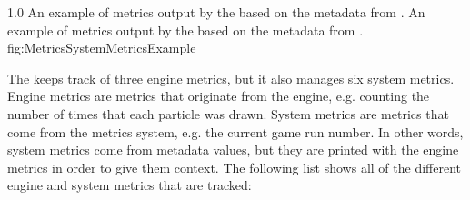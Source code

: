 {1.0}
{An example of metrics output by the  based on the metadata from .}
{An example of metrics output by the  based on the metadata from . }
{fig:MetricsSystemMetricsExample}


The  keeps track of three engine metrics, but it also manages six system metrics. Engine metrics are metrics that originate from the engine, e.g. counting the number of times that each particle was drawn. System metrics are metrics that come from the metrics system, e.g. the current game run number. In other words, system metrics come from metadata values, but they are printed with the engine metrics in order to give them context. The following list shows all of the different engine and system metrics that are tracked:

